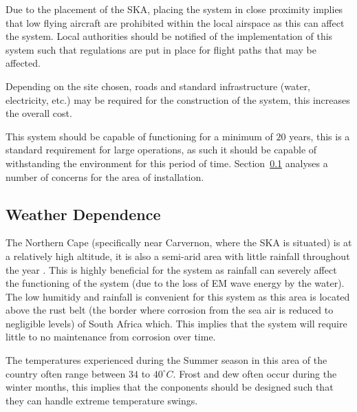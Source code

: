 \documentclass[11pt]{witseiepaper}
\begin{document}
Due to the placement of the SKA, placing the system in close proximity implies that low flying aircraft are prohibited within the local airspace as this can affect the system.
Local authorities should be notified of the implementation of this system such that regulations are put in place for flight paths that may be affected.

Depending on the site chosen, roads and standard infrastructure (water, electricity, etc.) may be required for the construction of the system, this increases the overall cost.

This system should be capable of functioning for a minimum of $20$ years, this is a standard requirement for large operations, as such it should be capable of withstanding the environment for this period of time. Section~\ref{sec:WeatherDependence} analyses a number of concerns for the area of installation.

\subsection{Weather Dependence} \label{sec:WeatherDependence}
The Northern Cape (specifically near Carvernon, where the SKA is situated) is at a relatively high altitude, it is also a semi-arid area with little rainfall throughout the year \cite{Rainfall}.
This is highly beneficial for the system as rainfall can severely affect the functioning of the system (due to the loss of EM wave energy by the water).
The low humitidy and rainfall is convenient for this system as this area is located above the rust belt (the border where corrosion from the sea air is reduced to negligible levels) of South Africa which. This implies that the system will require little to no maintenance from corrosion over time.

The temperatures experienced during the Summer season in this area of the country often range between $34$ to $40^{\circ} C$. Frost and dew often occur during the winter months, this implies that the conponents should be designed such that they can handle extreme temperature swings.





\end{document}
